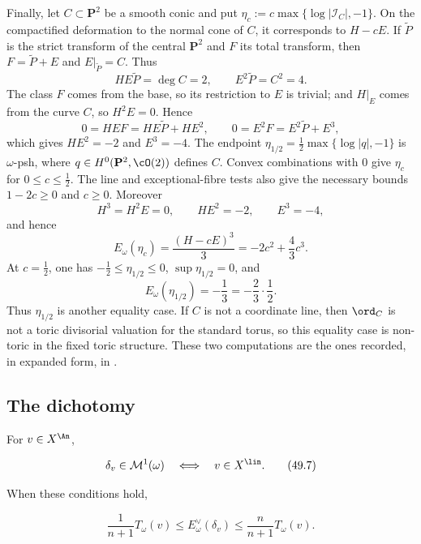 \begin{remark}
Finally, let $C\subset\mathbf P^2$ be a smooth conic and put
$\eta_c:=c\max\{\log|\mathcal I_C|,-1\}$.  On the compactified
deformation to the normal cone of $C$, it corresponds to $H-cE$.  If
$\widetilde P$ is the strict transform of the central $\mathbf P^2$
and $F$ its total transform, then
$F=\widetilde P+E$ and $E|_{\widetilde P}=C$.  Thus
\[
 HE\widetilde P=\deg C=2,
 \qquad E^2\widetilde P=C^2=4.
\]
The class $F$ comes from the base, so its restriction to $E$ is
trivial; and $H|_E$ comes from the curve $C$, so $H^2E=0$.  Hence
\[
 0=HEF=HE\widetilde P+HE^2,
 \qquad
 0=E^2F=E^2\widetilde P+E^3,
\]
which gives $HE^2=-2$ and $E^3=-4$.
The endpoint
$\eta_{1/2}=\tfrac12\max\{\log|q|,-1\}$ is $\omega$-psh,
where $q\in H^0(\mathbf P^2,\cO(2))$ defines $C$.
Convex combinations with $0$ give $\eta_c$ for
$0\le c\le\tfrac12$.  The line and exceptional-fibre tests also
give the necessary bounds $1-2c\ge0$ and $c\ge0$.  Moreover
\[
 H^3=H^2E=0,\qquad HE^2=-2,\qquad E^3=-4,
\]
and hence
\[
 E_\omega(\eta_c)=\frac{(H-cE)^3}{3}
 =-2c^2+\frac43c^3.
\]
At $c=\tfrac12$, one has
$-\tfrac12\le\eta_{1/2}\le0$,
$\sup\eta_{1/2}=0$, and
\[
 E_\omega(\eta_{1/2})=-\frac13
 =-\frac23\cdot\frac12.
\]
Thus $\eta_{1/2}$ is another equality case.  If $C$ is not a
coordinate line, then $\ord_C$ is not a toric divisorial valuation for
the standard torus, so this equality case is non-toric in the fixed toric
structure.  These two computations are the ones recorded, in expanded
form, in .
\end{remark}

\subsection{The dichotomy}
\label{sec:ch49-dichotomy}

\begin{theorem}\label{thm:bj-dirac-finite-energy}
For $v\in X^{\An}$,

\[
 \delta_v\in\mathcal M^1(\omega)
       \quad\Longleftrightarrow\quad v\in X^{\lin}.
\tag{49.7}\label{eq:bj-dirac-e1-iff}
\]

When these conditions hold,

\[
 \frac1{n+1}T_\omega(v)
 \leq E_\omega^\vee(\delta_v)
 \leq\frac n{n+1}T_\omega(v).
\tag{49.8}\label{eq:bj-dirac-energy-T}
\]
\end{theorem}

